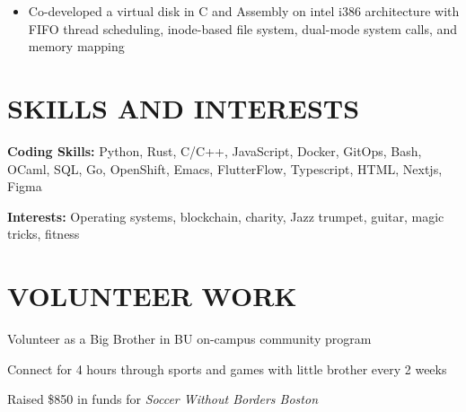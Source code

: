 \documentclass[10pt]{article}
\begin{document}
\begin{FlushLeft}
  \begin{itemize}
  \item Co-developed a virtual disk in C and Assembly on intel i386 architecture with FIFO thread scheduling, inode-based file system, dual-mode system calls, and memory mapping
  \end{itemize}
  
  \section{SKILLS AND INTERESTS}
  \vspace{-0.75em}
  \begin{itemize}{
    \item {\bf Coding Skills:} Python, Rust, C/C++, JavaScript, Docker, GitOps, Bash, OCaml, SQL, Go, OpenShift, Emacs, FlutterFlow, Typescript, HTML, Nextjs, Figma
    \item {\bf Interests:} Operating systems, blockchain, charity, Jazz trumpet, guitar, magic tricks, fitness
    }
  \end{itemize}

  \section{VOLUNTEER WORK}

  \begin{itemize}{
    \item Volunteer as a Big Brother in BU on-campus community program
    \item Connect for 4 hours through sports and games with little brother every 2 weeks
    }
  \end{itemize}

  
  \begin{itemize}{
      
    \item Raised \$850 in funds for \textit{Soccer Without Borders Boston}
    }
  \end{itemize}
  

\end{FlushLeft}
\end{document}
